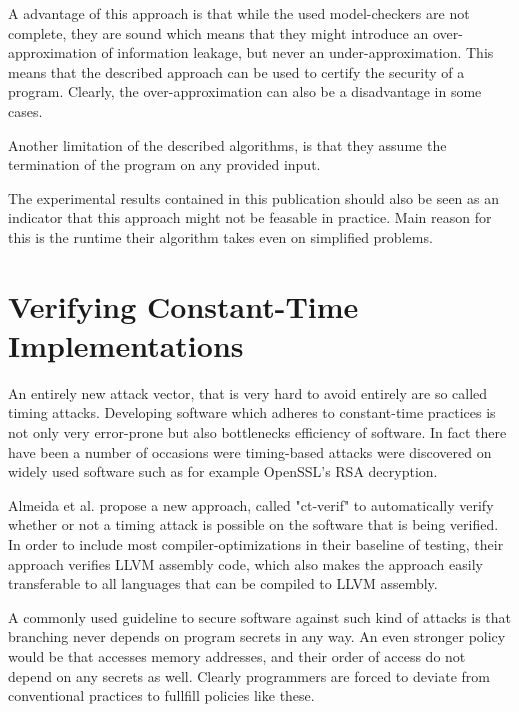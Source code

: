 \documentclass[a4paper,UKenglish]{lipics-v2018}
\begin{document}
A advantage of this approach is that while the used model-checkers are not complete, they are sound which means that they might introduce an over-approximation of information leakage, but never an under-approximation. This means that the described approach can be used to certify the security of a program.\cite{automatic_discovery_and_quantification} Clearly, the over-approximation can also be a disadvantage in some cases. 

Another limitation of the described algorithms, is that they assume the termination of the program on any provided input.

The experimental results contained in this publication should also be seen as an indicator that this approach might not be feasable in practice. Main reason for this is the runtime their algorithm takes even on simplified problems.\cite{automatic_discovery_and_quantification}


\newpage
\section{Verifying Constant-Time Implementations}

An entirely new attack vector, that is very hard to avoid entirely are so called timing attacks. Developing software which adheres to constant-time practices is not only very error-prone but also bottlenecks efficiency of software. In fact there have been a number of occasions were timing-based attacks were discovered on widely used software such as for example OpenSSL's RSA decryption.


Almeida et al. propose a new approach, called "ct-verif" to automatically verify whether  or not a timing attack is possible on the software that is being verified. In order to include most compiler-optimizations in their baseline of testing, their approach verifies LLVM assembly code, which also makes the approach easily transferable to all languages that can be compiled to LLVM assembly.\cite{verifying_constant_time_implementations}

A commonly used guideline to secure software against such kind of attacks is that branching never depends on program secrets in any way. An even stronger policy would be that accesses memory addresses, and their order of access do not depend on any secrets as well. Clearly programmers are forced to deviate from conventional practices to fullfill policies like these.\cite{verifying_constant_time_implementations}
\end{document}
